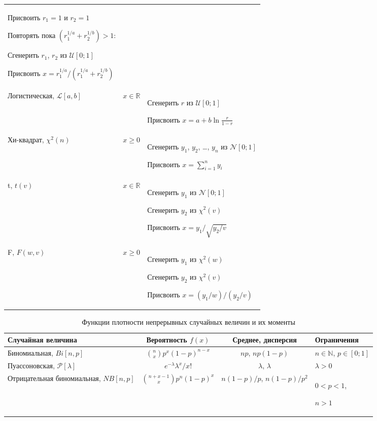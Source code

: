 \begin{table}[h]
\begin{tabular}{p{5cm}p{2cm}p{9cm}}
Присвоить $r_1=1$ и $r_2=1$

Повторять пока $(r_1^{1/a}+r_2^{1/b}) > 1$:

\hspace{0.5cm} Сгенерить $r_1$, $r_2$ из $\mathcal{U}[0;1]$

Присвоить $x=r_1^{1/a}/(r_1^{1/a}+r_2^{1/b})$ \\

Логистическая, $\mathcal{L}[a,b]$ & $x\in \mathbb{R}$ & Сгенерить $r$ из $\mathcal{U}[0;1]$ 

Присвоить $x=a+b\ln \frac{r}{1-r}$ \\ 
Хи-квадрат, $\chi^2(n)$ & $x\geq 0$ & Сгенерить $y_1$, $y_2$, \ldots, $y_n$ из $\mathcal{N}[0;1]$

Присвоить $x=\sum_{i=1}^n y_i$\\ 
t, $t(v)$ & $x\in \mathbb{R}$ & Сгенерить $y_1$ из $\mathcal{N}[0;1]$

Сгенерить $y_2$ из $\chi^2(v)$

Присвоить $x=y_1/\sqrt{y_2/v}$ \\ 
F, $F(w,v)$ & $x \geq 0$ & Сгенерить $y_1$ из $\chi^2(w)$

Сгенерить $y_2$ из $\chi^2(v)$

Присвоить $x=(y_1/w)/(y_2/v)$ \\
\hline
\hline 
\end{tabular}
\end{table}


\begin{table}[h]
\caption{\label{tab:pred}  Функции плотности непрерывных случайных величин и их моменты}
\begin{tabular}{p{5cm}ccp{3cm}}
\hline 
\hline
Случайная величина & Вероятность $f(x)$ & Среднее, дисперсия & Ограничения\\ 
\hline 
Биномиальная, $Bi[n,p]$ & $\binom{n}{x}p^x(1-p)^{n-x}$ & $np$, $np(1-p)$ & $n\in \mathbb{N}$, $p\in[0;1]$ \\
Пуассоновская, $\mathcal{P}[\lambda]$ & $e^{-\lambda}\lambda^x/x!$ & $\lambda$, $\lambda$ & $\lambda>0$ \\
Отрицательная биномиальная, $NB[n,p]$ & $\binom{n+x-1}{x}p^n(1-p)^x$ & $n(1-p)/p$, $n(1-p)/p^2$ & $0<p<1$, 

$n>1$\\
\hline
\hline
\end{tabular} 
\end{table}


